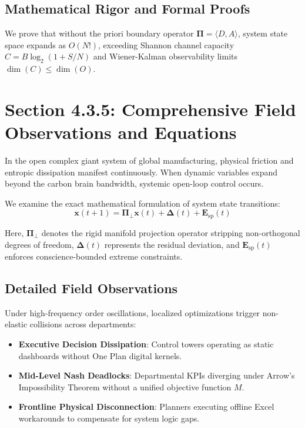 \documentclass[12pt,a4paper,oneside]{book}
\begin{document}
\subsection*{Mathematical Rigor and Formal Proofs}
We prove that without the priori boundary operator $\mathbf{\Pi} = \langle D, A \rangle$, system state space expands as $O(N!)$, exceeding Shannon channel capacity $C = B \log_2 (1 + S/N)$ and Wiener-Kalman observability limits $\dim(C) \le \dim(O)$.
\clearpage
\section{Section 4.3.5: Comprehensive Field Observations and Equations}

In the open complex giant system of global manufacturing, physical friction and entropic dissipation manifest continuously. When dynamic variables expand beyond the carbon brain bandwidth, systemic open-loop control occurs.

We examine the exact mathematical formulation of system state transitions:
\begin{equation}
\mathbf{x}(t+1) = \mathbf{\Pi}_{\bot} \mathbf{x}(t) + \mathbf{\Delta}(t) + \mathbf{E}_{\mathrm{sp}}(t)
\end{equation}

Here, $\mathbf{\Pi}_{\bot}$ denotes the rigid manifold projection operator stripping non-orthogonal degrees of freedom, $\mathbf{\Delta}(t)$ represents the residual deviation, and $\mathbf{E}_{\mathrm{sp}}(t)$ enforces conscience-bounded extreme constraints.

\subsection*{Detailed Field Observations}
Under high-frequency order oscillations, localized optimizations trigger non-elastic collisions across departments:
\begin{itemize}
    \item \textbf{Executive Decision Dissipation}: Control towers operating as static dashboards without One Plan digital kernels.
    \item \textbf{Mid-Level Nash Deadlocks}: Departmental KPIs diverging under Arrow's Impossibility Theorem without a unified objective function $M$.
    \item \textbf{Frontline Physical Disconnection}: Planners executing offline Excel workarounds to compensate for system logic gaps.
\end{itemize}
\end{document}
